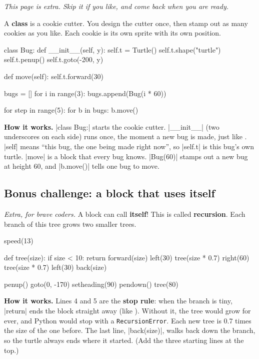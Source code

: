 \textit{This page is extra. Skip it if you like, and come back when you are ready.}

A \textbf{class} is a cookie cutter. You design the cutter once, then stamp out as many cookies as you like. Each cookie is its own sprite with its own position.

\begin{code}
class Bug:
    def __init__(self, y):
        self.t = Turtle()
        self.t.shape("turtle")
        self.t.penup()
        self.t.goto(-200, y)

    def move(self):
        self.t.forward(30)

bugs = []
for i in range(3):
    bugs.append(Bug(i * 60))

for step in range(5):
    for b in bugs:
        b.move()
\end{code}

\textbf{How it works.} \py|class Bug:| starts the cookie cutter. \py|__init__| (two underscores on each side) runs once, the moment a new bug is made, just like . \py|self| means ``this bug, the one being made right now'', so \py|self.t| is this bug's own turtle. \py|move| is a block that every bug knows. \py|Bug(60)| stamps out a new bug at height 60, and \py|b.move()| tells one bug to move.

\subsection*{Bonus challenge: a block that uses itself}

\textit{Extra, for brave coders.} A block can call \textbf{itself}! This is called \textbf{recursion}. Each branch of this tree grows two smaller trees.

\begin{code}
speed(13)

def tree(size):
    if size < 10:
        return
    forward(size)
    left(30)
    tree(size * 0.7)
    right(60)
    tree(size * 0.7)
    left(30)
    back(size)

penup()
goto(0, -170)
setheading(90)
pendown()
tree(80)
\end{code}

\textbf{How it works.} Lines 4 and 5 are the \textbf{stop rule}: when the branch is tiny, \py|return| ends the block straight away (like ). Without it, the tree would grow for ever, and Python would stop with a \texttt{RecursionError}. Each new tree is 0.7 times the size of the one before. The last line, \py|back(size)|, walks back down the branch, so the turtle always ends where it started. (Add the three starting lines at the top.)

